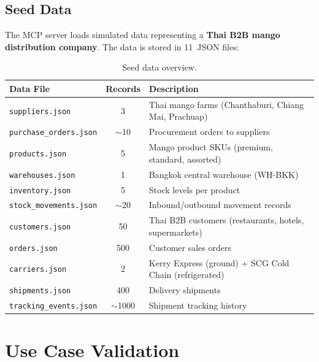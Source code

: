 \documentclass[12pt,a4paper]{report}
\begin{document}
\section{Seed Data}

The MCP server loads simulated data representing a \textbf{Thai B2B mango distribution company}. The data is stored in 11~JSON files:

\begin{table}[H]
\centering\small
\caption{Seed data overview.}
\begin{tabularx}{\textwidth}{@{} l c X @{}}
\toprule
\textbf{Data File} & \textbf{Records} & \textbf{Description} \\
\midrule
\texttt{suppliers.json}        & 3   & Thai mango farms (Chanthaburi, Chiang Mai, Prachuap) \\
\texttt{purchase\_orders.json} & $\sim$10  & Procurement orders to suppliers \\
\texttt{products.json}         & 5   & Mango product SKUs (premium, standard, assorted) \\
\texttt{warehouses.json}       & 1   & Bangkok central warehouse (WH-BKK) \\
\texttt{inventory.json}        & 5   & Stock levels per product \\
\texttt{stock\_movements.json} & $\sim$20  & Inbound/outbound movement records \\
\texttt{customers.json}        & 50  & Thai B2B customers (restaurants, hotels, supermarkets) \\
\texttt{orders.json}           & 500 & Customer sales orders \\
\texttt{carriers.json}         & 2   & Kerry Express (ground) + SCG Cold Chain (refrigerated) \\
\texttt{shipments.json}        & 400 & Delivery shipments \\
\texttt{tracking\_events.json} & $\sim$1000 & Shipment tracking history \\
\bottomrule
\end{tabularx}
\end{table}

\chapter{Use Case Validation}
\end{document}
